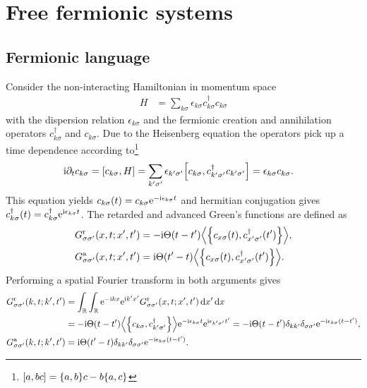 \documentclass[english, parskip=full]{scrartcl}
\title{\titel}
\author{\autor}
\date{\today}
\begin{document}
\maketitle  %

\section{Free fermionic systems}
\subsection{Fermionic language}
Consider the non-interacting Hamiltonian in momentum space
\begin{align}
H &= \sum_{k\sigma} \epsilon_{k\sigma} c_{k\sigma}^\dagger c_{k\sigma}
\end{align}
with the dispersion relation $\epsilon_{k\sigma}$ and the fermionic creation and annihilation operators $c_{k\sigma}^\dagger$ and $c_{k\sigma}$.
Due to the Heisenberg equation the operators pick up a time dependence according to\footnote{$\klb*{a, bc} = \klc*{a,b}c - b\klc*{a,c}$}
\begin{align}
\i\partial_t c_{k\sigma} &= \klb*{c_{k\sigma}, H} = \sum_{k'\sigma'} \epsilon_{k'\sigma'} \klb*{c_{k\sigma}, c_{k'\sigma'}^\dagger c_{k'\sigma'}} = \epsilon_{k\sigma} c_{k\sigma}.
\end{align}
This equation yields $c_{k\sigma}(t) = c_{k\sigma} \text{e}^{-\text{i}\epsilon_{k\sigma} t}$ and hermitian conjugation gives $c_{k\sigma}^\dagger(t) = c_{k\sigma}^\dagger \text{e}^{\text{i}\epsilon_{k\sigma} t}$.
The retarded and advanced Green's functions are defined as
\begin{align}
G^\r_{\sigma\sigma'}(x,t;x',t') &= -\i\Theta(t-t') \bra*{\klc*{c_{x\sigma}(t), c_{x'\sigma'}^\dagger(t')}},\\
G^\a_{\sigma\sigma'}(x,t;x',t') &= \i\Theta(t'-t) \bra*{\klc*{c_{x\sigma}(t), c_{x'\sigma'}^\dagger(t')}}.
\end{align}
Performing a spatial Fourier transform in both arguments gives
\begin{align}
G^\r_{\sigma\sigma'}(k,t;k',t') &= \intr{\intr{\powe{-\i kx} \powe{\i k'x'} G^\r_{\sigma\sigma'}(x,t;x',t') }{x'}}{x} \\
&= -\i\Theta(t-t') \bra*{\klc*{c_{k\sigma}, c_{k'\sigma'}^\dagger}} \powe{-\i\epsilon_{k\sigma}t} \powe{\i\epsilon_{k'\sigma'}t'} = -\i\Theta(t-t') \delta_{kk'} \delta_{\sigma\sigma'} \powe{-\i\epsilon_{k\sigma} (t-t')},\\
G^\a_{\sigma\sigma'}(k,t;k',t') &= \i\Theta(t'-t) \delta_{kk'} \delta_{\sigma\sigma'} \powe{-\i\epsilon_{k\sigma} (t-t')}.
\end{align}
\end{document}
